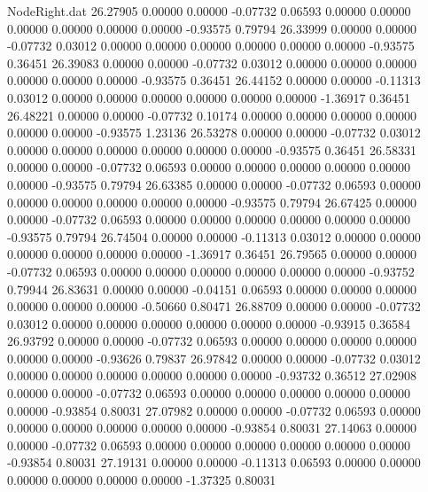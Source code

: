 \begin{filecontents}{NodeRight.dat}
  26.27905    0.00000    0.00000    -0.07732    0.06593    0.00000    0.00000    0.00000    0.00000    0.00000    0.00000   -0.93575    0.79794
  26.33999    0.00000    0.00000    -0.07732    0.03012    0.00000    0.00000    0.00000    0.00000    0.00000    0.00000   -0.93575    0.36451
  26.39083    0.00000    0.00000    -0.07732    0.03012    0.00000    0.00000    0.00000    0.00000    0.00000    0.00000   -0.93575    0.36451
  26.44152    0.00000    0.00000    -0.11313    0.03012    0.00000    0.00000    0.00000    0.00000    0.00000    0.00000   -1.36917    0.36451
  26.48221    0.00000    0.00000    -0.07732    0.10174    0.00000    0.00000    0.00000    0.00000    0.00000    0.00000   -0.93575    1.23136
  26.53278    0.00000    0.00000    -0.07732    0.03012    0.00000    0.00000    0.00000    0.00000    0.00000    0.00000   -0.93575    0.36451
  26.58331    0.00000    0.00000    -0.07732    0.06593    0.00000    0.00000    0.00000    0.00000    0.00000    0.00000   -0.93575    0.79794
  26.63385    0.00000    0.00000    -0.07732    0.06593    0.00000    0.00000    0.00000    0.00000    0.00000    0.00000   -0.93575    0.79794
  26.67425    0.00000    0.00000    -0.07732    0.06593    0.00000    0.00000    0.00000    0.00000    0.00000    0.00000   -0.93575    0.79794
  26.74504    0.00000    0.00000    -0.11313    0.03012    0.00000    0.00000    0.00000    0.00000    0.00000    0.00000   -1.36917    0.36451
  26.79565    0.00000    0.00000    -0.07732    0.06593    0.00000    0.00000    0.00000    0.00000    0.00000    0.00000   -0.93752    0.79944
  26.83631    0.00000    0.00000    -0.04151    0.06593    0.00000    0.00000    0.00000    0.00000    0.00000    0.00000   -0.50660    0.80471
  26.88709    0.00000    0.00000    -0.07732    0.03012    0.00000    0.00000    0.00000    0.00000    0.00000    0.00000   -0.93915    0.36584
  26.93792    0.00000    0.00000    -0.07732    0.06593    0.00000    0.00000    0.00000    0.00000    0.00000    0.00000   -0.93626    0.79837
  26.97842    0.00000    0.00000    -0.07732    0.03012    0.00000    0.00000    0.00000    0.00000    0.00000    0.00000   -0.93732    0.36512
  27.02908    0.00000    0.00000    -0.07732    0.06593    0.00000    0.00000    0.00000    0.00000    0.00000    0.00000   -0.93854    0.80031
  27.07982    0.00000    0.00000    -0.07732    0.06593    0.00000    0.00000    0.00000    0.00000    0.00000    0.00000   -0.93854    0.80031
  27.14063    0.00000    0.00000    -0.07732    0.06593    0.00000    0.00000    0.00000    0.00000    0.00000    0.00000   -0.93854    0.80031
  27.19131    0.00000    0.00000    -0.11313    0.06593    0.00000    0.00000    0.00000    0.00000    0.00000    0.00000   -1.37325    0.80031

\end{filecontents}
